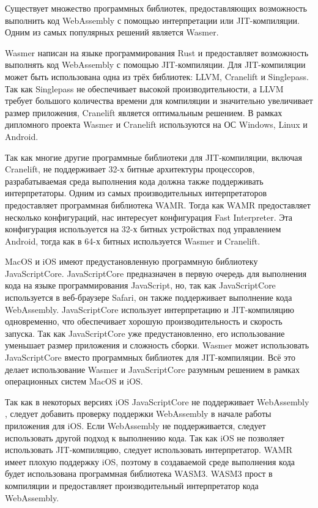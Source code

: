 Существует множество программных библиотек, предоставляющих возможность выполнить код WebAssembly с помощью интерпретации или JIT-компиляции.
Одним из самых популярных решений является Wasmer.

Wasmer написан на языке программирования Rust и предоставляет возможность выполнять код WebAssembly с помощью JIT-компиляции.
Для JIT-компиляции может быть использована одна из трёх библиотек: LLVM, Cranelift и Singlepass.
Так как Singlepass не обеспечивает высокой производительности, а LLVM требует большого количества времени для компиляции \cite{WasmerRuntimes} и значительно увеличивает размер приложения, Cranelift является оптимальным решением.
В рамках дипломного проекта Wasmer и Cranelift используются на ОС Windows, Linux и Android.

Так как многие другие программные библиотеки для JIT-компиляции, включая Cranelift, не поддерживает 32-х битные архитектуры процессоров, разрабатываемая среда выполнения кода должна также поддерживать интерпретаторы.
Одним из самых производительных интерпретаторов предоставляет программная библиотека WAMR.
Тогда как WAMR предоставляет несколько конфигураций, нас интересует конфигурация Fast Interpreter.
Эта конфигурация используется на 32-х битных устройствах под управлением Android, тогда как в 64-х битных используется Wasmer и Cranelift.

MacOS и iOS имеют предустановленную программную библиотеку JavaScriptCore.
JavaScriptCore предназначен в первую очередь для выполнения кода на языке программирования JavaScript, но, так как JavaScriptCore используется в веб-браузере Safari, он также поддерживает выполнение кода WebAssembly.
JavaScriptCore использует интерпретацию и JIT-компиляцию одновременно, что обеспечивает хорошую производительность и скорость запуска.
Так как JavaScriptCore уже предустановленно, его использование уменьшает размер приложения и сложность сборки.
Wasmer может использовать JavaScriptCore вместо программных библиотек для JIT-компиляции.
Всё это делает использование Wasmer и JavaScriptCore разумным решением в рамках операционных систем MacOS и iOS.

Так как в некоторых версиях iOS JavaScriptCore не поддерживает WebAssembly \cite{JSCNoWasm}, следует добавить проверку поддержки WebAssembly в начале работы приложения для iOS.
Если WebAssembly не поддерживается, следует использовать другой подход к выполнению кода.
Так как iOS не позволяет использовать JIT-компиляцию, следует использовать интерпретатор.
WAMR имеет плохую поддержку iOS, поэтому в создаваемой среде выполнения кода будет использована программная библиотека WASM3.
WASM3 прост в компиляции и предоставляет производительный интерпретатор кода WebAssembly.


